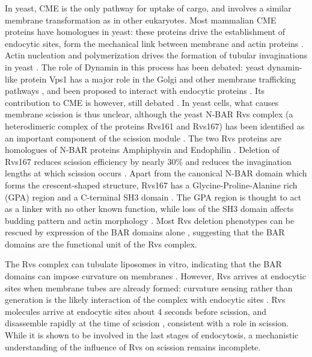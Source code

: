 \documentclass[9pt,lineno]{elife}
\begin{document}
In yeast, CME is the only pathway for uptake of cargo, and involves a similar membrane transformation as in other eukaryotes. Most mammalian CME proteins have homologues in yeast: these proteins drive the establishment of endocytic sites, form the mechanical link between membrane and actin proteins \cite{Kaksonen2018}. Actin nucleation and polymerization drives the formation of tubular invaginations in yeast \citep{Kubler1993a, Kaksonen2003}. The role of Dynamin in this process has been debated:  yeast dynamin-like protein Vps1 has a major role in the Golgi and other membrane trafficking pathways \cite{Rothman1990,Peters2004,Hoepfner2001}, and been proposed to interact with endocytic proteins \cite{Nannapaneni2010b, Yu2004,Smaczynska-deRooij2012}. Its contribution to CME is however, still debated \cite{GoudGadila2017,Kishimoto2011}. In yeast cells, what causes membrane scission is thus unclear, although the yeast N-BAR Rvs complex (a heterodimeric complex of the proteins Rvs161 and Rvs167) has been identified as an important component of the scission module \cite{Munn1995,Kaksonen2005,DHondt2000,Kishimoto2011}. The two Rvs proteins are homologues of N-BAR proteins Amphiphysin and Endophilin \cite{Friesen2006,Youn2010}. Deletion of Rvs167 reduces scission efficiency by nearly 30\% and reduces the invagination lengths at which scission occurs \cite{Kaksonen2005,Kukulski2012}. Apart from the canonical N-BAR domain which forms the crescent-shaped structure,  Rvs167 has a Glycine-Proline-Alanine rich (GPA) region and a C-terminal SH3 domain \cite{Sivadon1997}. The GPA region is thought to act as a linker with no other known function, while loss of the SH3 domain affects budding pattern and actin morphology \cite{Sivadon1997}. Most Rvs deletion phenotypes can be rescued by expression of the BAR domains alone \cite{Sivadon1997}, suggesting that the BAR domains are the functional unit of the Rvs complex.

The Rvs complex can tubulate liposomes in vitro, indicating that the BAR domains can impose curvature on membranes \cite{Youn2010}. However, Rvs arrives at endocytic sites when membrane tubes are already formed: curvature sensing rather than generation is the likely interaction of the complex with endocytic sites \cite{Kukulski2012,Picco2015}. Rvs molecules arrive at endocytic sites about 4 seconds before scission, and disassemble rapidly at the time of scission \cite{Picco2015}, consistent with a role in scission. While it is shown to be involved in the last stages of endocytosis, a mechanistic understanding of the influence of Rvs on scission remains incomplete. 
\end{document}
